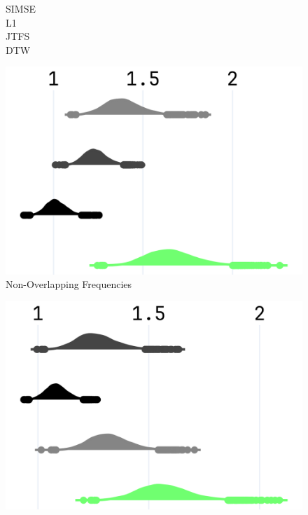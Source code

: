 \begin{figure}[t]
  \centering
  \begin{minipage}[t]{\textwidth}
    \begin{minipage}[t]{0.045\textwidth}
      \footnotesize\raggedleft
      \vspace{-2.75cm} %
      SIMSE\\[0.4cm]
      L1\\[0.385cm]
      JTFS\\[0.365cm]
      DTW
    \end{minipage}%
    \hspace{0.01\textwidth}%
    \begin{minipage}[t]{0.91\textwidth}
      \centering
      \begin{minipage}[t]{0.31\textwidth}
        \centering
        \includegraphics[width=\linewidth]{images/npsk_ood_P_Loss_0.png}
        \vspace{0.3em}
        \footnotesize Non-Overlapping Frequencies
      \end{minipage}
      \hspace{0.015\textwidth}%
      \begin{minipage}[t]{0.31\textwidth}
        \centering
        \includegraphics[width=\linewidth]{images/npsk_ood_P_Loss_1.png}

\end{minipage}
\end{minipage}
\end{minipage}
\end{figure}
